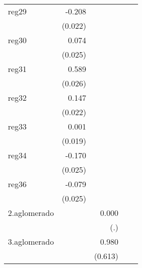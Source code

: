 {\begin{longtable}{l*{4}{D{.}{.}{-1}}}
\addlinespace
reg29       &      -0.208\sym{***}&                     &                     &                     \\
            &     (0.022)         &                     &                     &                     \\
\addlinespace
reg30       &       0.074\sym{**} &                     &                     &                     \\
            &     (0.025)         &                     &                     &                     \\
\addlinespace
reg31       &       0.589\sym{***}&                     &                     &                     \\
            &     (0.026)         &                     &                     &                     \\
\addlinespace
reg32       &       0.147\sym{***}&                     &                     &                     \\
            &     (0.022)         &                     &                     &                     \\
\addlinespace
reg33       &       0.001         &                     &                     &                     \\
            &     (0.019)         &                     &                     &                     \\
\addlinespace
reg34       &      -0.170\sym{***}&                     &                     &                     \\
            &     (0.025)         &                     &                     &                     \\
\addlinespace
reg36       &      -0.079\sym{**} &                     &                     &                     \\
            &     (0.025)         &                     &                     &                     \\
\addlinespace
2.aglomerado&                     &       0.000         &                     &                     \\
            &                     &         (.)         &                     &                     \\
\addlinespace
3.aglomerado&                     &       0.980         &                     &                     \\
            &                     &     (0.613)         &                     &                     \\

\end{longtable}}
